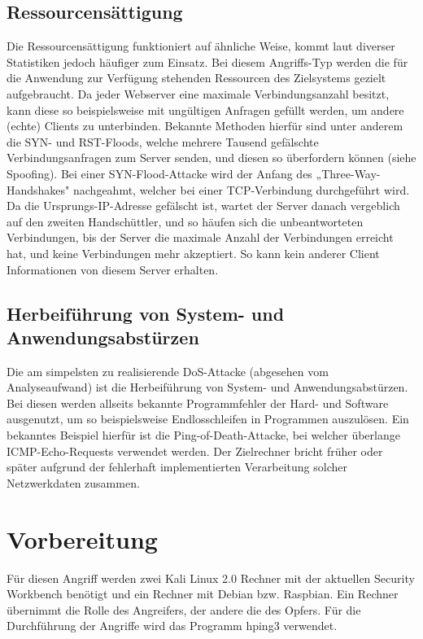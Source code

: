 \subsection{Ressourcensättigung}
Die Ressourcensättigung funktioniert auf ähnliche Weise, kommt laut diverser Statistiken jedoch häufiger zum Einsatz. Bei diesem Angriffs-Typ werden die für die Anwendung zur Verfügung stehenden Ressourcen des Zielsystems gezielt aufgebraucht. Da jeder Webserver eine maximale Verbindungsanzahl besitzt, kann diese so beispielsweise mit ungültigen Anfragen gefüllt werden, um andere (echte) Clients zu unterbinden. Bekannte Methoden hierfür sind unter anderem die SYN- und RST-Floods, welche mehrere Tausend gefälschte Verbindungsanfragen zum Server senden, und diesen so überfordern können (siehe Spoofing). Bei einer SYN-Flood-Attacke wird der Anfang des „Three-Way- Handshakes" nachgeahmt, welcher bei einer TCP-Verbindung durchgeführt wird. Da die Ursprungs-IP-Adresse gefälscht ist, wartet der Server danach vergeblich auf den zweiten Handschüttler, und so häufen sich die unbeantworteten Verbindungen, bis der Server die maximale Anzahl der Verbindungen erreicht hat, und keine Verbindungen mehr akzeptiert. So kann kein anderer Client Informationen von diesem Server erhalten.

\subsection{Herbeiführung von System- und Anwendungsabstürzen}
Die am simpelsten zu realisierende DoS-Attacke (abgesehen vom Analyseaufwand) ist die Herbeiführung von System- und Anwendungsabstürzen. Bei diesen werden allseits bekannte Programmfehler der Hard- und Software ausgenutzt, um so beispielsweise Endlosschleifen in Programmen auszulösen. Ein bekanntes Beispiel hierfür ist die Ping-of-Death-Attacke, bei welcher überlange ICMP-Echo-Requests verwendet werden. Der Zielrechner bricht früher oder später aufgrund der fehlerhaft implementierten Verarbeitung solcher Netzwerkdaten zusammen.

\section{Vorbereitung}
Für diesen Angriff werden zwei Kali Linux 2.0 Rechner mit der aktuellen Security Workbench benötigt und ein Rechner mit Debian bzw. Raspbian.
Ein Rechner übernimmt die Rolle des Angreifers, der andere die des Opfers.
Für die Durchführung der Angriffe wird das Programm hping3 verwendet.



